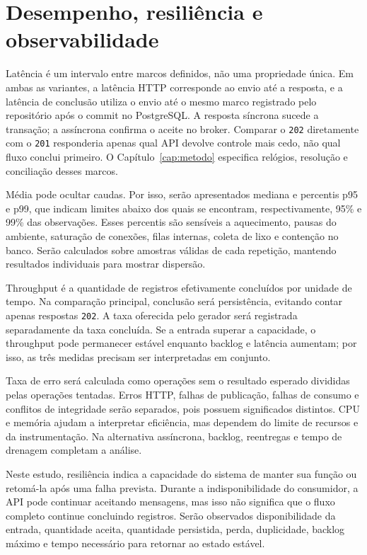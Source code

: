 \section{Desempenho, resiliência e observabilidade}

Latência é um intervalo entre marcos definidos, não uma propriedade única. Em ambas as variantes, a latência HTTP corresponde ao envio até a resposta, e a latência de conclusão utiliza o envio até o mesmo marco registrado pelo repositório após o commit no PostgreSQL. A resposta síncrona sucede a transação; a assíncrona confirma o aceite no broker. Comparar o \texttt{202} diretamente com o \texttt{201} responderia apenas qual API devolve controle mais cedo, não qual fluxo conclui primeiro. O Capítulo~\ref{cap:metodo} especifica relógios, resolução e conciliação desses marcos.

Média pode ocultar caudas. Por isso, serão apresentados mediana e percentis p95 e p99, que indicam limites abaixo dos quais se encontram, respectivamente, 95\% e 99\% das observações. Esses percentis são sensíveis a aquecimento, pausas do ambiente, saturação de conexões, filas internas, coleta de lixo e contenção no banco. Serão calculados sobre amostras válidas de cada repetição, mantendo resultados individuais para mostrar dispersão.

Throughput é a quantidade de registros efetivamente concluídos por unidade de tempo. Na comparação principal, conclusão será persistência, evitando contar apenas respostas \texttt{202}. A taxa oferecida pelo gerador será registrada separadamente da taxa concluída. Se a entrada superar a capacidade, o throughput pode permanecer estável enquanto backlog e latência aumentam; por isso, as três medidas precisam ser interpretadas em conjunto.

Taxa de erro será calculada como operações sem o resultado esperado divididas pelas operações tentadas. Erros HTTP, falhas de publicação, falhas de consumo e conflitos de integridade serão separados, pois possuem significados distintos. CPU e memória ajudam a interpretar eficiência, mas dependem do limite de recursos e da instrumentação. Na alternativa assíncrona, backlog, reentregas e tempo de drenagem completam a análise.

Neste estudo, resiliência indica a capacidade do sistema de manter sua função ou retomá-la após uma falha prevista. Durante a indisponibilidade do consumidor, a API pode continuar aceitando mensagens, mas isso não significa que o fluxo completo continue concluindo registros. Serão observados disponibilidade da entrada, quantidade aceita, quantidade persistida, perda, duplicidade, backlog máximo e tempo necessário para retornar ao estado estável.

